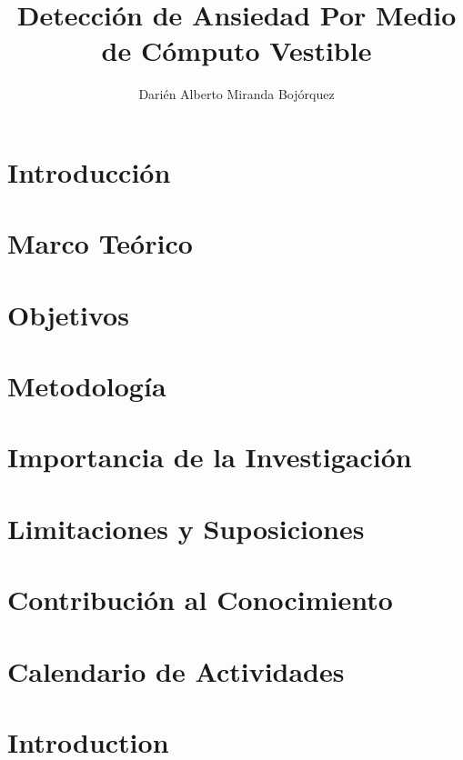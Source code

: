 \documentclass[letterpaper,12pt]{cicese}
\begin{document}
	\doublespace
	\title{Detecci\'on de Ansiedad Por Medio de C\'omputo Vestible}
	\author{Dari\'en Alberto Miranda Boj\'orquez}
	\maketitle
	\newpage
	\tableofcontents
	\newpage
		\chapter{Introducci\'on}
		\chapter{Marco Te\'orico}
		\chapter{Objetivos}
		\chapter{Metodolog\'ia}
		\chapter{Importancia de la Investigaci\'on}
		\chapter{Limitaciones y Suposiciones}
		\chapter{Contribuci\'on al Conocimiento}
		\chapter{Calendario de Actividades}
		\chapter{Introduction}
	
\end{document}

